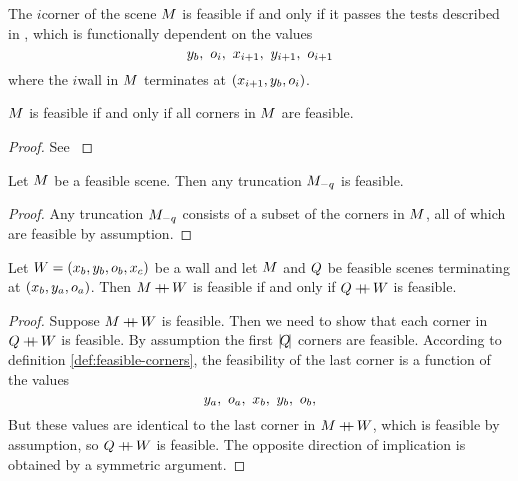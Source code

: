 \begin{definition}
  \label{def:feasible-corners}
  The $i$\th corner of the scene $\Scene$ is feasible if and only if
  it passes the tests described in \cite{Lee09}, which is
  functionally dependent on the values
  \begin{equation}
    y_b,~\WallOrient_i,~x_{i+1},~y_{i+1},~\WallOrient_{i+1}
  \end{equation}
  where the $i$\th wall in $\Scene$ terminates at
  $(x_{i+1},y_b,\WallOrient_i)$.
\end{definition}

\begin{lemma}
  \label{def:feasible-scenes}
  $\Scene$ is feasible if and only if all corners in $\Scene$ are feasible.
\end{lemma}
\begin{proof}
  See \cite{Lee09}
\end{proof}

\begin{lemma}
  \label{lemma:trunc-feasibility}
  Let $\Scene$ be a feasible scene. Then any truncation $\Scene_{-q}$ is
  feasible.
\end{lemma}
\begin{proof}
  Any truncation $\Scene_{-q}$ consists of a subset of the corners in
  $\Scene$, all of which are feasible by assumption.
\end{proof}

\begin{lemma}
  \label{lemma:concat-feasibility}
  Let $\Wall=(x_b,y_b,\WallOrient_b,x_c)$ be a wall and let $\Scene$ and
  $\OtherScene$ be feasible scenes terminating at
  $(x_b,y_a,\WallOrient_a)$. Then $\Scene\concat\Wall$ is feasible if
  and only if $\OtherScene\concat\Wall$ is feasible.
\end{lemma}
\begin{proof}
  Suppose $\Scene\concat\Wall$ is feasible. Then we need to show that
  each corner in $\OtherScene\concat\Wall$ is feasible. By assumption
  the first $\Length{\OtherScene}$ corners are feasible. According to
  definition \ref{def:feasible-corners}, the feasibility of the last corner
  is a function of the values
  \begin{equation}
    y_a,~\WallOrient_a,~x_b,~y_b,~\WallOrient_b,
  \end{equation}
  But these values are identical to the last corner in
  $\Scene\concat\Wall$, which is feasible by assumption, so
  $\OtherScene\concat\Wall$ is feasible. The opposite
  direction of implication is obtained by a symmetric argument.
\end{proof}

